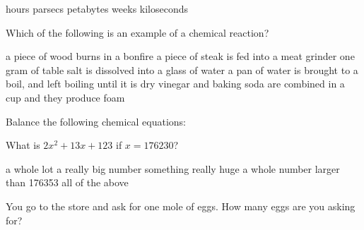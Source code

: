 \documentclass[11pt,addpoints]{exam}   	%
\begin{document}
\begin{questions}
\begin{choices}
 hours
 parsecs
 petabytes
 weeks
 kiloseconds
\end{choices}
\vspace{.2in}

\question[5]
Which of the following is an example of a chemical reaction?

\begin{choices}
\choice a piece of wood burns in a bonfire
\choice a piece of steak is fed into a meat grinder
\choice one gram of table salt is dissolved into a glass of water
\choice a pan of water is brought to a boil, and left boiling until it is dry
\choice vinegar and baking soda are combined in a cup and they produce foam
\end{choices}
\vspace{.2in}

\question
Balance the following chemical equations:
\pagebreak

\question[1] What is $2x^2 + 13x + 123$ if $ x = 176230 $?

\begin{choices}
\choice a whole lot
\choice a really big number
\choice something really huge
\choice a whole number larger than 176353
\choice all of the above
\end{choices}
\vspace{.2in}

\question[1] You go to the store and ask for one mole of eggs. How many eggs are you asking for?
\vspace{.2in}


\end{questions}
\end{document}
